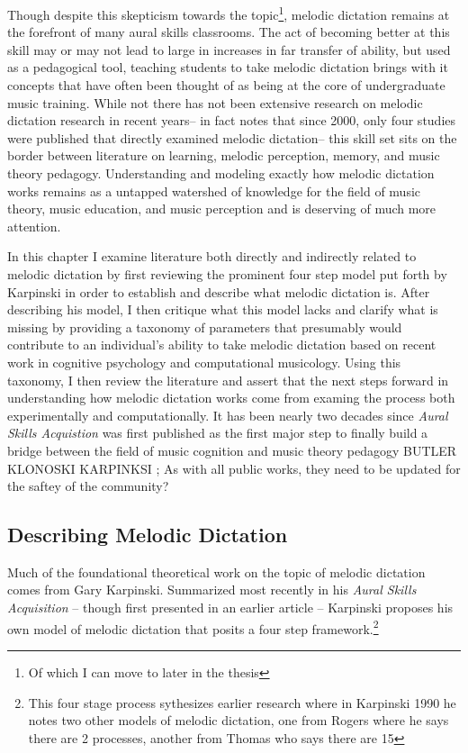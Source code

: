 \documentclass[]{book}
\let\rmarkdownfootnote\footnote%
\def\footnote{\protect\rmarkdownfootnote}
\theoremstyle{definition}
\theoremstyle{definition}
\theoremstyle{definition}
\theoremstyle{remark}
\begin{document}
Though despite this skepticism towards the topic\footnote{Of which I can
  move to later in the thesis}, melodic dictation remains at the
forefront of many aural skills classrooms. The act of becoming better at
this skill may or may not lead to large in increases in far transfer of
ability, but used as a pedagogical tool, teaching students to take
melodic dictation brings with it concepts that have often been thought
of as being at the core of undergraduate music training. While not there
has not been extensive research on melodic dictation research in recent
years-- in fact \citep{paneyEffectDirectingAttention2016} notes that
since 2000, only four studies were published that directly examined
melodic dictation-- this skill set sits on the border between literature
on learning, melodic perception, memory, and music theory pedagogy.
Understanding and modeling exactly how melodic dictation works remains
as a untapped watershed of knowledge for the field of music theory,
music education, and music perception and is deserving of much more
attention.

In this chapter I examine literature both directly and indirectly
related to melodic dictation by first reviewing the prominent four step
model put forth by Karpinski in order to establish and describe what
melodic dictation is. After describing his model, I then critique what
this model lacks and clarify what is missing by providing a taxonomy of
parameters that presumably would contribute to an individual's ability
to take melodic dictation based on recent work in cognitive psychology
and computational musicology. Using this taxonomy, I then review the
literature and assert that the next steps forward in understanding how
melodic dictation works come from examing the process both
experimentally and computationally. It has been nearly two decades since
\emph{Aural Skills Acquistion} was first published as the first major
step to finally build a bridge between the field of music cognition and
music theory pedagogy BUTLER KLONOSKI KARPINKSI ; As with all public
works, they need to be updated for the saftey of the community?

\hypertarget{describing-melodic-dictation}{%
\subsection{Describing Melodic
Dictation}\label{describing-melodic-dictation}}

Much of the foundational theoretical work on the topic of melodic
dictation comes from Gary Karpinski. Summarized most recently in his
\emph{Aural Skills Acquisition}
\citep{karpinskiAuralSkillsAcquisition2000}-- though first presented in
an earlier article \citep{karpinskiModelMusicPerception1990}-- Karpinski
proposes his own model of melodic dictation that posits a four step
framework.\footnote{This four stage process sythesizes earlier research
  where in Karpinski 1990 he notes two other models of melodic
  dictation, one from Rogers where he says there are 2 processes,
  another from Thomas who says there are 15}
\end{document}
